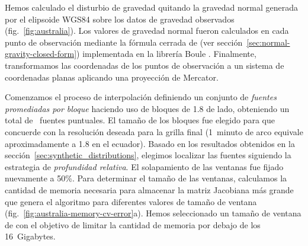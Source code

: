 Hemos calculado el disturbio de gravedad quitando la gravedad normal generada
por el elipsoide WGS84 sobre los datos de gravedad observados
(fig.~\ref{fig:australia}).
Los valores de gravedad normal fueron calculados en cada punto de observación
mediante la fórmula cerrada de \citet{ligotze2001} (ver
sección~\ref{sec:normal-gravity-closed-form}) implementada en la librería Boule
\citep{boule2020}.
Finalmente, transformamos las coordenadas de los puntos de observación a un
sistema de coordenadas planas aplicando una proyección de Mercator.

Comenzamos el proceso de interpolación definiendo un conjunto de \emph{fuentes
promediadas por bloque} haciendo uso de bloques de 1.8\km{} de lado, obteniendo
un total de \AustraliaEqlNSources{}~fuentes puntuales.
El tamaño de los bloques fue elegido para que concuerde con la resolución
deseada para la grilla final (1~minuto de arco equivale aproximadamente
a 1.8\km{} en el ecuador).
Basado en los resultados obtenidos en la
sección~\ref{sec:synthetic_distributions}, elegimos localizar las fuentes
siguiendo la estrategia de \emph{profundidad relativa}.
El solapamiento de las ventanas fue fijado nuevamente a 50\%.
Para determinar el tamaño de las ventanas, calculamos la cantidad de memoria
necesaria para almacenar la matriz Jacobiana más grande que genera el algoritmo
para diferentes valores de tamaño de ventana
(fig.~\ref{fig:australia-memory-cv-error}a).
Hemos seleccionado un tamaño de ventana de \AustraliaEqlWindowSize{} con el
objetivo de limitar la cantidad de memoria por debajo de los 16~Gigabytes.

